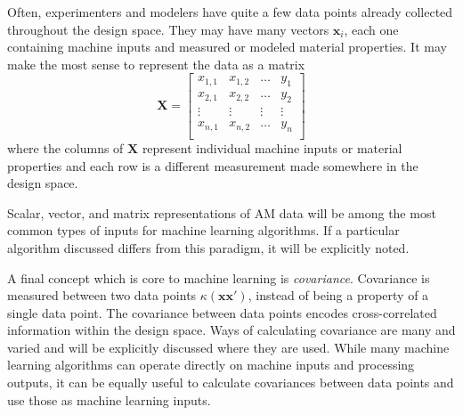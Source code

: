 Often, experimenters and modelers have quite a few data points already collected throughout the design space. They may have many vectors $\mathbf{x}_i$, each one containing machine inputs and measured or modeled material properties. It may make the most sense to represent the data as a matrix 
\begin{equation}
	\mathbf{X} = \begin{bmatrix} x_{1,1} & x_{1,2} & \hdots & y_1 \\
						x_{2,1} & x_{2,2} & \hdots & y_2 \\
						\vdots & \vdots & \vdots & \vdots \\
						x_{n,1} & x_{n,2} & \hdots & y_n \\
				\end{bmatrix}
	\label{matrix}
\end{equation}
where the columns of $\mathbf{X}$ represent individual machine inputs or material properties and each row is a different measurement made somewhere in the design space. 

Scalar, vector, and matrix representations of AM data will be among the most common types of inputs for machine learning algorithms. If a particular algorithm discussed differs from this paradigm, it will be explicitly noted. 

A final concept which is core to machine learning is \textit{covariance}. Covariance is measured between two data points $\kappa (\mathbf{x}\mathbf{x}')$, instead of being a property of a single data point. The covariance between data points encodes cross-correlated information within the design space. Ways of calculating covariance are many and varied and will be explicitly discussed where they are used. While many machine learning algorithms can operate directly on machine inputs and processing outputs, it can be equally useful to calculate covariances between data points and use those as machine learning inputs.